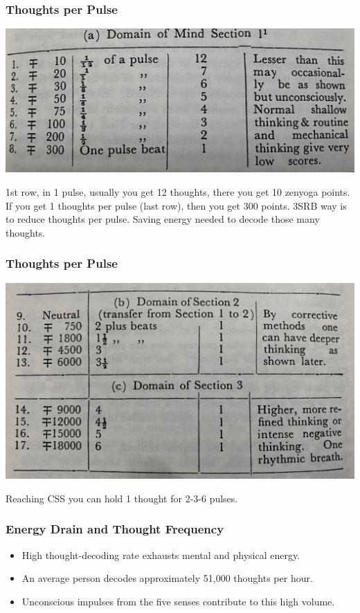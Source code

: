 \begin{frame}[fragile]\frametitle{Thoughts per Pulse}
	\begin{center}
	\includegraphics[width=0.9\linewidth,keepaspectratio]{images/zenyoga3}
	\end{center}
	
1st row, in 1 pulse, usually you get 12 thoughts, there you get 10 zenyoga points. If you get 1 thoughts per pulse (last row), then you get 300 points. 3SRB way is to reduce thoughts per pulse. Saving energy needed to decode those many thoughts.

\end{frame}

\begin{frame}[fragile]\frametitle{Thoughts per Pulse}
	\begin{center}
	\includegraphics[width=0.9\linewidth,keepaspectratio]{images/zenyoga4}
	\end{center}
	
Reaching CSS you can hold 1 thought for 2-3-6 pulses.

\end{frame}

\begin{frame}[fragile]\frametitle{Energy Drain and Thought Frequency}
    \begin{itemize}
        \item High thought-decoding rate exhausts mental and physical energy.
        \item An average person decodes approximately 51,000 thoughts per hour.
        \item Unconscious impulses from the five senses contribute to this high volume.
    \end{itemize}
\end{frame}

